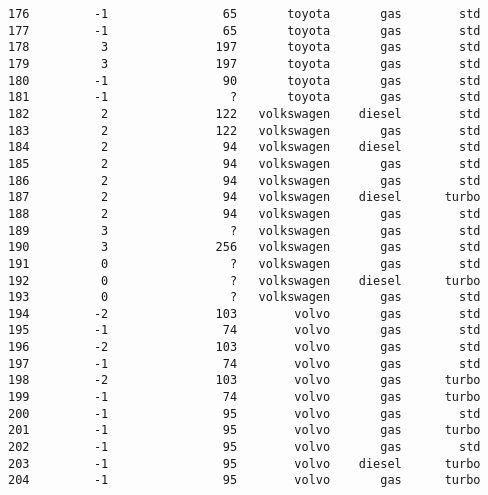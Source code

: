 \documentclass[11pt]{article}
\begin{document}
\begin{tcolorbox}[breakable, boxrule=.5pt, size=fbox, pad at break*=1mm, opacityfill=0]
\begin{Verbatim}[commandchars=\\\{\}]
176         -1                65       toyota       gas        std
177         -1                65       toyota       gas        std
178          3               197       toyota       gas        std
179          3               197       toyota       gas        std
180         -1                90       toyota       gas        std
181         -1                 ?       toyota       gas        std
182          2               122   volkswagen    diesel        std
183          2               122   volkswagen       gas        std
184          2                94   volkswagen    diesel        std
185          2                94   volkswagen       gas        std
186          2                94   volkswagen       gas        std
187          2                94   volkswagen    diesel      turbo
188          2                94   volkswagen       gas        std
189          3                 ?   volkswagen       gas        std
190          3               256   volkswagen       gas        std
191          0                 ?   volkswagen       gas        std
192          0                 ?   volkswagen    diesel      turbo
193          0                 ?   volkswagen       gas        std
194         -2               103        volvo       gas        std
195         -1                74        volvo       gas        std
196         -2               103        volvo       gas        std
197         -1                74        volvo       gas        std
198         -2               103        volvo       gas      turbo
199         -1                74        volvo       gas      turbo
200         -1                95        volvo       gas        std
201         -1                95        volvo       gas      turbo
202         -1                95        volvo       gas        std
203         -1                95        volvo    diesel      turbo
204         -1                95        volvo       gas      turbo


\end{Verbatim}
\end{tcolorbox}
\end{document}
